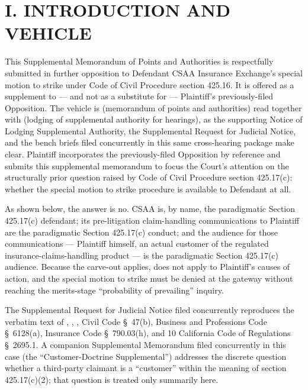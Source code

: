\newcommand{\docshorttitle}{SUPPL.\ MEMO P\&A --- \S 425.17(c) COMMERCIAL CARVE-OUT (CGC-25-631802)}
\newcommand{\doctitleblock}{PLAINTIFF'S SUPPLEMENTAL MEMORANDUM OF POINTS AND AUTHORITIES IN FURTHER OPPOSITION TO DEFENDANT'S SPECIAL MOTION TO STRIKE (CODE CIV.\ PROC., \S\S~425.16, 425.17(c))}
\newcommand{\docsubblock}{(Cal.\ Rules of Court, rules 3.1113, 3.1306(c); supplemental to Plaintiff's previously-filed Opposition; cross-noticed for hearings of May 13, 2026 and May 19, 2026, Dept.\ 302)}




\section*{I. INTRODUCTION AND VEHICLE}

This Supplemental Memorandum of Points and Authorities is respectfully submitted in further opposition to Defendant CSAA Insurance Exchange's special motion to strike under Code of Civil Procedure section 425.16. It is offered as a supplement to --- and not as a substitute for --- Plaintiff's previously-filed Opposition. The vehicle is  (memorandum of points and authorities) read together with  (lodging of supplemental authority for hearings), as the supporting Notice of Lodging Supplemental Authority, the Supplemental Request for Judicial Notice, and the bench briefs filed concurrently in this same cross-hearing package make clear. Plaintiff incorporates the previously-filed Opposition by reference and submits this supplemental memorandum to focus the Court's attention on the structurally prior question raised by Code of Civil Procedure section 425.17(c): whether the special motion to strike procedure is available to Defendant at all.

As shown below, the answer is no. CSAA is, by name, the paradigmatic Section 425.17(c) defendant; its pre-litigation claim-handling communications to Plaintiff are the paradigmatic Section 425.17(c) conduct; and the audience for those communications --- Plaintiff himself, an actual customer of the regulated insurance-claims-handling product --- is the paradigmatic Section 425.17(c) audience. Because the carve-out applies,  does not apply to Plaintiff's causes of action, and the special motion to strike must be denied at the gateway without reaching the merits-stage  ``probability of prevailing'' inquiry.

The Supplemental Request for Judicial Notice filed concurrently reproduces the verbatim text of , , , Civil Code \S~47(b), Business and Professions Code \S~6128(a), Insurance Code \S~790.03(h), and 10 California Code of Regulations \S~2695.1. A companion Supplemental Memorandum filed concurrently in this case (the ``Customer-Doctrine Supplemental'') addresses the discrete question whether a third-party claimant is a ``customer'' within the meaning of section 425.17(c)(2); that question is treated only summarily here.

